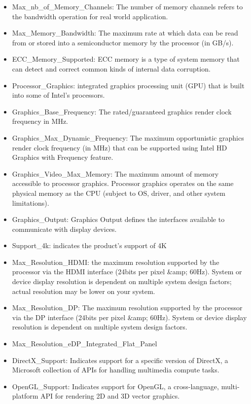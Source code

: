 \begin{itemize}
    \item Max\_nb\_of\_Memory\_Channels: The number of memory channels refers to the bandwidth operation for real world application.
    \item Max\_Memory\_Bandwidth: The maximum rate at which data can be read from or stored into a semiconductor memory by the processor (in GB/s). 
    \item ECC\_Memory\_Supported: ECC memory is a type of system memory that can detect and correct common kinds of internal data corruption.
    \item Processor\_Graphics: integrated graphics processing unit (GPU) that is built into some of Intel's processors.
    \item Graphics\_Base\_Frequency: The rated/guaranteed graphics render clock frequency in MHz.
    \item Graphics\_Max\_Dynamic\_Frequency: The maximum opportunistic graphics render clock frequency (in MHz) that can be supported using Intel HD Graphics with Frequency feature.
    \item Graphics\_Video\_Max\_Memory: The maximum amount of memory accessible to processor graphics. Processor graphics operates on the same physical memory as the CPU (subject to OS, driver, and other system limitations).
    \item Graphics\_Output: Graphics Output defines the interfaces available to communicate with display devices.
    \item Support\_4k: indicates the product's support of 4K
    \item Max\_Resolution\_HDMI: the maximum resolution supported by the processor via the HDMI interface (24bits per pixel \&amp; 60Hz). System or device display resolution is dependent on multiple system design factors; actual resolution may be lower on your system.
    \item Max\_Resolution\_DP: The maximum resolution supported by the processor via the DP interface (24bits per pixel \&amp; 60Hz). System or device display resolution is dependent on multiple system design factors.
    \item Max\_Resolution\_eDP\_Integrated\_Flat\_Panel	
    \item DirectX\_Support: Indicates support for a specific version of DirectX, a Microsoft collection of APIs for handling multimedia compute tasks.
    \item OpenGL\_Support: Indicates support for OpenGL, a cross-language, multi-platform API for rendering 2D and 3D vector graphics. 

\end{itemize}
